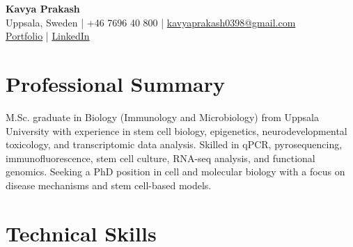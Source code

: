 \documentclass[10pt, a4paper]{article}
\begin{document}

\begin{center}
  {\LARGE\bfseries Kavya Prakash}\\[4pt]
  Uppsala, Sweden \quad|\quad
  +46 7696 40 800 \quad|\quad
  \href{mailto:kavyaprakash0398@gmail.com}{kavyaprakash0398@gmail.com}\\[2pt]
  \href{https://kavyaprakash.me}{Portfolio}
  \quad|\quad
  \href{https://www.linkedin.com/in/kavya-prakash-vks/}{LinkedIn}
\end{center}

\vspace{2pt}

\section{Professional Summary}

M.Sc. graduate in Biology (Immunology and Microbiology) from Uppsala University with experience in stem cell biology, epigenetics, neurodevelopmental toxicology, and transcriptomic data analysis. Skilled in qPCR, pyrosequencing, immunofluorescence, stem cell culture, RNA-seq analysis, and functional genomics. Seeking a PhD position in cell and molecular biology with a focus on disease mechanisms and stem cell-based models.

\vspace{2pt}

\section{Technical Skills}
\end{document}
